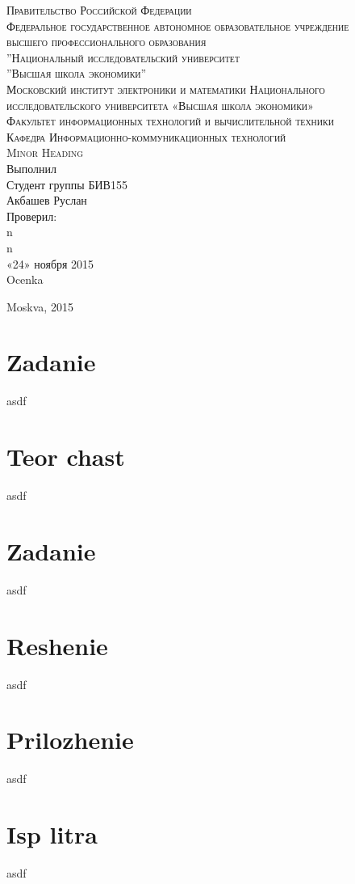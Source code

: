 \documentclass[13pt]{article}
\begin{document}
 
\begin{titlepage}

\fontsize{50pt}{80pt}\selectfont
\textsc{\LARGE Правительство Российской Федерации}\\[1.5cm]
\textsc{\LARGE Федеральное государственное автономное образовательное учреждение}\\[2.0cm]
\textsc{\LARGE высшего профессионального образования}\\[2.0cm]
\textsc{\LARGE ''Национальный исследовательский университет}\\[2.0cm]
\textsc{\LARGE ''Высшая школа экономики''}\\[2.0cm]
\textsc{\Large Московский институт электроники и математики Национального}\\[0.5cm]
\textsc{\Large исследовательского университета «Высшая школа экономики»}\\[0.5cm]
\textsc{\Large Факультет информационных технологий и вычислительной техники}\\[0.5cm]
\textsc{\Large Кафедра Информационно-коммуникационных технологий}\\[0.5cm]
\textsc{\large Minor Heading}\\[0.5cm]

{\centering \large 
\hfill Выполнил \\
\hfill Студент группы БИВ155\\
\hfill Акбашев Руслан \\
\hfill Проверил: \\
\hfill n \\
\hfill n \\
\hfill «24» ноября 2015 \\
\hfill Ocenka \\
}

{\large Moskva, 2015}\\[3cm]

\end{titlepage}
  
\newpage
\tableofcontents
{}
\newpage

\section{Zadanie}
asdf
\newpage

\section{Teor chast}
asdf
\newpage

\section{Zadanie}
asdf
\newpage

\section{Reshenie}
asdf
\newpage

\section{Prilozhenie}
asdf
\newpage

\section{Isp litra}
asdf
\newpage
\end{document}
